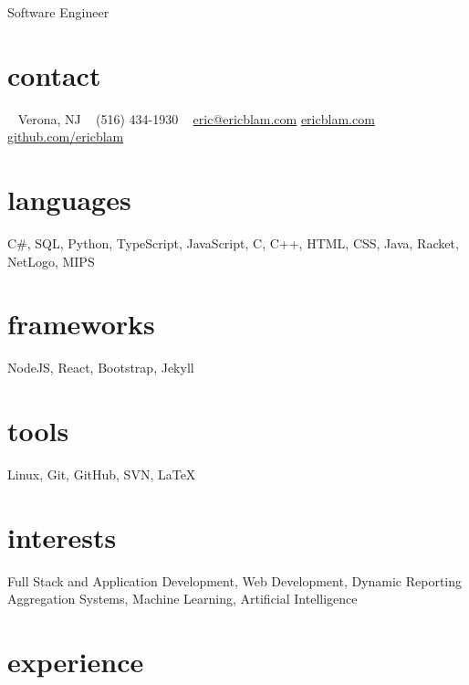 \documentclass[]{friggeri-cv}
\begin{document}
       {Software Engineer}

\begin{aside}
  \section{contact}
    ~
    Verona, NJ
    ~
    (516) 434-1930
    ~
    \href{mailto:eric@ericblam.com}{eric@ericblam.com}
    \href{https://ericblam.com}{ericblam.com}
    \href{https://github.com/ericblam}{github.com/ericblam}
  \section{languages}
    C\#, SQL, Python, TypeScript, JavaScript, C, C++, HTML, CSS, Java, Racket, NetLogo, MIPS
  \section{frameworks}
    NodeJS, React, Bootstrap, Jekyll
  \section{tools}
    Linux, Git, GitHub, SVN, \LaTeX
\end{aside}

\section{interests}

Full Stack and Application Development, Web Development, Dynamic Reporting Aggregation Systems, Machine Learning, Artificial Intelligence

\section{experience}
\end{document}
